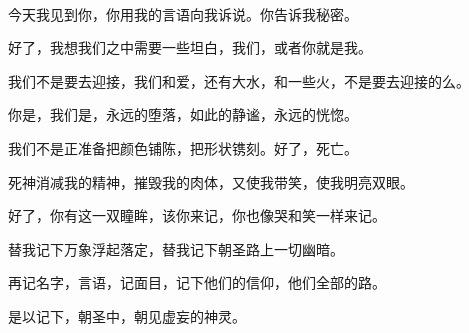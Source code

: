 \documentclass[UTF8]{article}
\begin{document}
\\[0.6cm]
\par 今天我见到你，你用我的言语向我诉说。你告诉我秘密。
\par 好了，我想我们之中需要一些坦白，我们，或者你就是我。
\par 我们不是要去迎接，我们和爱，还有大水，和一些火，不是要去迎接的么。
\par 你是，我们是，永远的堕落，如此的静谧，永远的恍惚。
\par 我们不是正准备把颜色铺陈，把形状镌刻。好了，死亡。
\par 死神消减我的精神，摧毁我的肉体，又使我带笑，使我明亮双眼。
\par 好了，你有这一双瞳眸，该你来记，你也像哭和笑一样来记。
\par 替我记下万象浮起落定，替我记下朝圣路上一切幽暗。
\par 再记名字，言语，记面目，记下他们的信仰，他们全部的路。
\par 是以记下，朝圣中，朝见虚妄的神灵。
\end{document}
